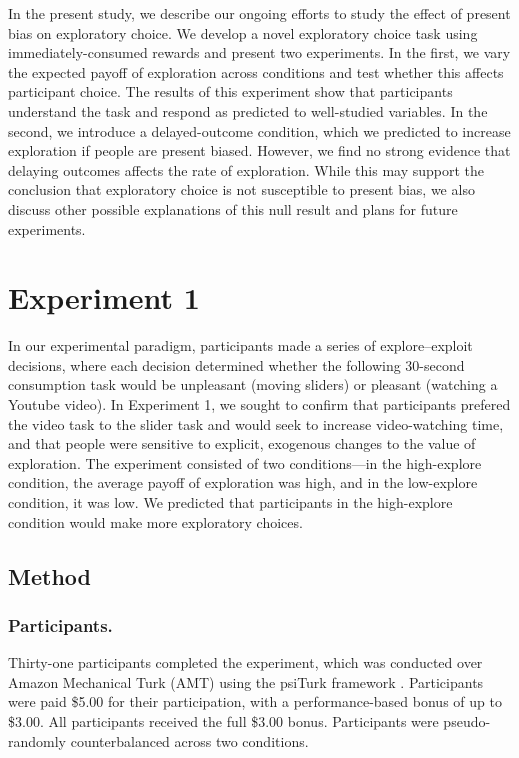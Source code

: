 \documentclass[10pt,letterpaper]{article}
\begin{document}
In the present study, we describe our ongoing efforts to study the effect of present bias
on exploratory choice. We develop a novel exploratory choice task using
immediately-consumed rewards and present two experiments. In the first, we vary
the expected payoff of exploration across conditions and test whether this affects
participant choice. The results of this experiment show that participants understand the task and respond
as predicted to well-studied variables. In the second, we introduce a
delayed-outcome condition, which we predicted to increase exploration
if people are present biased. However, we find no strong evidence that delaying outcomes affects
the rate of exploration. While this may support the conclusion that exploratory
choice is not susceptible to present bias, we also discuss other possible
explanations of this null result and plans for future experiments.

\section{Experiment 1}

In our experimental paradigm, participants made a series of explore--exploit
decisions, where each decision determined whether the following 30-second
consumption task would be unpleasant (moving sliders) or pleasant (watching a
Youtube video). In Experiment 1, we sought to confirm that participants prefered
the video task to the slider task and would seek to increase video-watching
time, and that people were sensitive to explicit, exogenous changes to the value
of exploration. The experiment consisted of two conditions---in the high-explore
condition, the average payoff of exploration was high, and in the low-explore
condition, it was low. We predicted that participants in the high-explore condition
would make more exploratory choices.

\subsection{Method}

\subsubsection{Participants.}

Thirty-one participants completed the experiment, which was conducted over
Amazon Mechanical Turk (AMT) using the psiTurk framework \citep{Gureckis2015a}.
Participants were paid \$5.00 for their participation, with a performance-based
bonus of up to \$3.00. All participants received the full \$3.00 bonus.
Participants were pseudo-randomly counterbalanced across two conditions.
\end{document}
